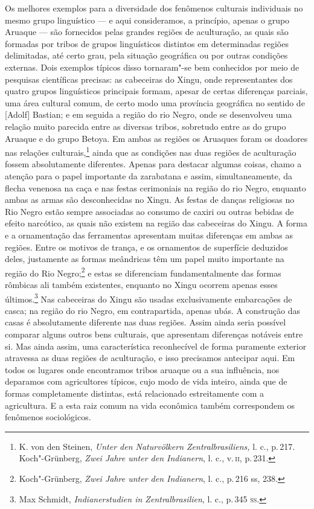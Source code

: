 Os melhores exemplos para a diversidade dos fenômenos culturais
individuais no mesmo grupo linguístico --- e aqui consideramos, a
princípio, apenas o grupo Aruaque --- são fornecidos pelas grandes
regiões de aculturação, as quais são formadas por tribos de grupos
linguísticos distintos em determinadas regiões delimitadas, até certo
grau, pela situação geográfica ou por outras condições externas. Dois
exemplos típicos disso tornaram"-se bem conhecidos por meio de pesquisas
científicas precisas: as cabeceiras do Xingu, onde representantes dos
quatro grupos linguísticos principais formam, apesar de certas
diferenças parciais, uma área cultural comum, de certo modo uma
província geográfica no sentido de {[}Adolf{]} Bastian; e em seguida a
região do rio Negro, onde se desenvolveu uma relação muito parecida
entre as diversas tribos, sobretudo entre as do grupo Aruaque e do grupo
Betoya. Em ambas as regiões os Aruaques foram os doadores nas relações
culturais,\footnote{K. von den Steinen, \textit{Unter den Naturvölkern
  Zentralbrasiliens,} l. c., p.\,217. Koch"-Grünberg, \textit{Zwei Jahre
  unter den Indianern}, l. c., v.\,\textsc{ii}, p.\,231.} ainda que as condições
nas duas regiões de aculturação fossem absolutamente diferentes.
Apenas para destacar algumas coisas, chamo a atenção para o papel
importante da zarabatana e assim, simultaneamente, da flecha venenosa na
caça e nas festas cerimoniais na região do rio Negro, enquanto ambas as
armas são desconhecidas no Xingu. As festas de danças religiosas no Rio
Negro estão sempre associadas ao consumo de caxiri ou outras bebidas de
efeito narcótico, as quais não existem na região das cabeceiras do
Xingu. A forma e a ornamentação das ferramentas apresentam muitas
diferenças em ambas as regiões. Entre os motivos de trança, e os
ornamentos de superfície deduzidos deles, justamente as formas
meândricas têm um papel muito importante na região do Rio
Negro;\footnote{Koch"-Grünberg, \textit{Zwei Jahre unter den Indianern}, l.
  c., p.\,216 ss, 238.} e estas se diferenciam fundamentalmente das
formas rômbicas ali também existentes, enquanto no Xingu ocorrem apenas
esses últimos.\footnote{Max Schmidt, \textit{Indianerstudien in
  Zentralbrasilien}, l. c., p.\,345 \textsc{ss}.} Nas cabeceiras do Xingu são
usadas exclusivamente embarcações de casca; na região do rio Negro, em
contrapartida, apenas ubás. A construção das casas é absolutamente
diferente nas duas regiões. Assim ainda seria possível comparar alguns
outros bens culturais, que apresentam diferenças notáveis entre si. Mas
ainda assim, uma característica reconhecível de forma puramente exterior
atravessa as duas regiões de aculturação, e isso precisamos antecipar
aqui. Em todos os lugares onde encontramos tribos aruaque ou a sua
influência, nos deparamos com agricultores típicos, cujo modo de vida
inteiro, ainda que de formas completamente distintas, está relacionado
estreitamente com a agricultura. E a esta raiz comum na vida econômica
também correspondem os fenômenos sociológicos.

